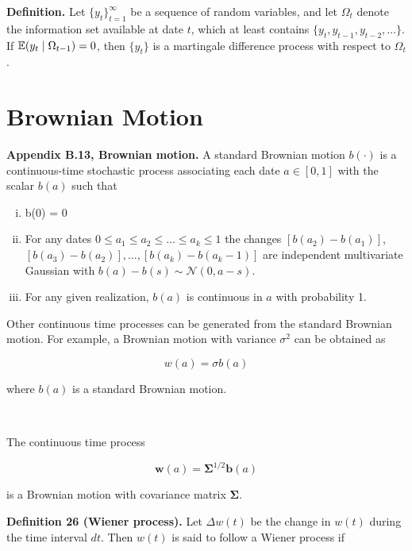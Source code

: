 \textbf{Definition.} Let \(\{y_t\}_{t=1}^\infty \) be a sequence of random variables, and let \(\Omega_t\) denote the information set available at date \(t\), which at least contains \(\{y_t, y_{t-1}, y_{t-2}, \ldots \}\). If \(\mathbb{E}(y_t \mid \Omega_{t-1}) =0\), then \(\{y_t\}\) is a martingale difference process with respect to \(\Omega_t\).

\section{Brownian Motion}

%
\textbf{Appendix B.13, Brownian motion.} A standard Brownian motion \(b(\cdot)\) is a continuous-time stochastic process associating each date \(a \in [0, 1]\) with the scalar \(b(a)\) such that

\begin{enumerate}[(i)]

\item b(0) = 0

\item For any dates \(0 \leq a_1 \leq a_2 \leq \ldots \leq a_k \leq 1\) the changes \([b(a_2) - b(a_1)]\), \([b(a_3) - b(a_2)], \ldots, [b(a_k) - b(a_k - 1)]\) are independent multivariate Gaussian with \(b(a) - b(s) \sim \mathcal{N}(0, a -s)\). 

\item For any given realization, \(b(a)\) is continuous in \(a\) with probability 1.

\end{enumerate}

Other continuous time processes can be generated from the standard Brownian motion. For example, a Brownian motion with variance \(\sigma^2\) can be obtained as

\[
w(a) = \sigma b(a)
\]

where \(b(a)\) is a standard Brownian motion.

\

The continuous time process

\[
\boldsymbol{w}(a) = \boldsymbol{\Sigma}^{1/2} \boldsymbol{b}(a)
\]

is a Brownian motion with covariance matrix \(\boldsymbol{\Sigma}\).

\textbf{Definition 26 (Wiener process).} Let \(\Delta w(t)\) be the change in \(w(t)\) during the time interval \(dt\). Then \(w(t)\) is said to follow a Wiener process if

